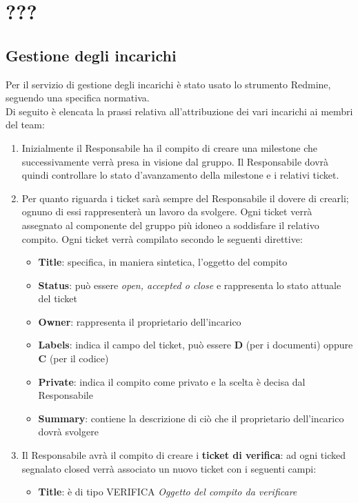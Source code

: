 \section{???}{
	\subsection{Gestione degli incarichi}{
		Per il servizio di gestione degli incarichi è stato usato lo strumento Redmine, seguendo una specifica normativa.\\Di seguito è elencata la prassi relativa all’attribuzione dei vari incarichi ai membri del team:
		\begin{enumerate}
			\item Inizialmente il Responsabile ha il compito di creare una milestone che successivamente verrà presa in visione dal gruppo. Il Responsabile dovrà quindi controllare lo stato d’avanzamento della milestone e i relativi ticket.
			\item Per quanto riguarda i ticket sarà sempre del Responsabile il dovere di crearli; ognuno di essi rappresenterà un lavoro da svolgere. Ogni ticket verrà assegnato al componente del gruppo più idoneo a soddisfare il relativo compito. Ogni ticket verrà compilato secondo le seguenti direttive:
			\begin{itemize}
				\item \textbf{Title}: specifica, in maniera sintetica, l’oggetto del compito
				\item \textbf{Status}: può essere \emph{open, accepted o close} e rappresenta lo stato attuale del ticket
				\item \textbf{Owner}: rappresenta il proprietario dell’incarico
				\item \textbf{Labels}: indica il campo del ticket, può essere \textbf{D} (per i documenti) oppure \textbf{C} (per il codice)
				\item \textbf{Private}: indica il compito come privato e la scelta è decisa dal Responsabile
				\item \textbf{Summary}: contiene la descrizione di ciò che il proprietario dell’incarico dovrà svolgere
			\end{itemize}
			\item Il Responsabile avrà  il compito di  creare i \textbf{ticket di verifica}: ad ogni ticked segnalato closed verrà associato un nuovo ticket con i seguenti campi:
			\begin{itemize}
				\item \textbf{Title}: è di tipo VERIFICA {\emph{Oggetto del compito da verificare}}

\end{itemize}
\end{enumerate}}}
